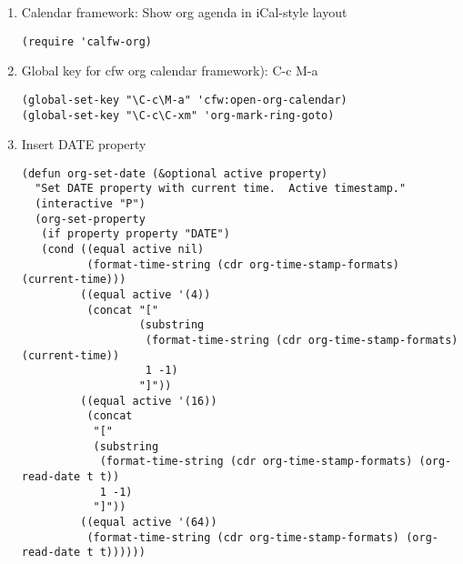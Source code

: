 \documentclass[nofonts]{tufte-handout}
\begin{document}
\begin{enumerate}
\begin{verbatim}
(defun org-agenda-open-file ()
  "Open a file from the current agenda file list."
  (interactive)
  (let* ((menu (grizzl-make-index org-agenda-files))
        (answer (grizzl-completing-read "Choose an agenda file: " menu)))
    (find-file answer)))

(defun org-agenda-list-files ()
  "List the paths that are currently in org-agenda-files"
  (interactive)
  (let  ((menu (grizzl-make-index org-agenda-files)))
    (grizzl-completing-read "These are currently the files in list org-agenda-files. " menu)))

(defun org-agenda-list-menu ()
 "Present menu with commands for loading, saving, adding and removing
files to org-agenda-files."
 (interactive)
 (let* ((menu (grizzl-make-index
               '("org-agenda-save-file-list"
                 "org-agenda-load-file-list"
                 "org-agenda-list-files"
                 "org-agenda-open-file"
                 "org-agenda-add-this-file-to-agenda"
                 "org-agenda-remove-this-file-from-agenda")))
        (command (grizzl-completing-read "Choose a command: " menu)))
   (call-interactively (intern command))))

(global-set-key (kbd "H-a H-a") 'org-agenda-list-menu)
\end{verbatim}


\item Calendar framework: Show org agenda in iCal-style layout
\label{sec-2-5-8-3}

\begin{verbatim}
(require 'calfw-org)
\end{verbatim}

\item Global key for cfw org calendar framework): C-c M-a
\label{sec-2-5-8-4}

\begin{verbatim}
(global-set-key "\C-c\M-a" 'cfw:open-org-calendar)
(global-set-key "\C-c\C-xm" 'org-mark-ring-goto)
\end{verbatim}

\item Insert DATE property
\label{sec-2-5-8-5}

\begin{verbatim}
(defun org-set-date (&optional active property)
  "Set DATE property with current time.  Active timestamp."
  (interactive "P")
  (org-set-property
   (if property property "DATE")
   (cond ((equal active nil)
          (format-time-string (cdr org-time-stamp-formats) (current-time)))
         ((equal active '(4))
          (concat "["
                  (substring
                   (format-time-string (cdr org-time-stamp-formats) (current-time))
                   1 -1)
                  "]"))
         ((equal active '(16))
          (concat
           "["
           (substring
            (format-time-string (cdr org-time-stamp-formats) (org-read-date t t))
            1 -1)
           "]"))
         ((equal active '(64))
          (format-time-string (cdr org-time-stamp-formats) (org-read-date t t))))))


\end{verbatim}
\end{enumerate}
\end{document}
